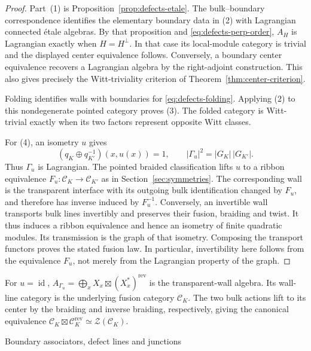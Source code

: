 \documentclass[12pt]{amsart}
\makeatletter
\renewcommand\subsection{\@startsection{subsection}{2}%
  \z@{.5\linespacing\@plus.7\linespacing}{-.5em}%
  {\normalfont\bfseries}}
\numberwithin{equation}{section}
\theoremstyle{definition}
\DeclareMathOperator{\id}{id}
\makeatother
\begin{document}
\begin{proof}
Part~\rm(1) is Proposition~\ref{prop:defects-etale}. The
bulk--boundary correspondence identifies the elementary boundary
data in \rm(2) with Lagrangian connected \'etale algebras.
By that proposition and \eqref{eq:defects-perp-order}, $A_H$ is
Lagrangian exactly when $H=H^\perp$. In that case its local-module
category is trivial and the displayed center equivalence follows.
Conversely, a boundary center equivalence recovers a Lagrangian
algebra by the right-adjoint construction. This also gives precisely
the Witt-triviality criterion of Theorem~\ref{thm:center-criterion}.

Folding identifies walls with boundaries for
\eqref{eq:defects-folding}. Applying \rm(2) to this nondegenerate
pointed category proves \rm(3). The folded category is Witt-trivial
exactly when its two factors represent opposite Witt classes.

For \rm(4), an isometry $u$ gives
$$
(q_K\oplus q_{K'}^{-1})(x,u(x))=1,\qquad
|\Gamma_u|^2=|G_K|\,|G_{K'}|.
$$
Thus $\Gamma_u$ is Lagrangian. The pointed braided classification
lifts $u$ to a ribbon equivalence $F_u:\mathcal C_K\to\mathcal C_{K'}$
as in Section~\ref{sec:symmetries}. The corresponding wall is the
transparent interface with its outgoing bulk identification changed
by $F_u$, and therefore has inverse induced by $F_u^{-1}$.
Conversely, an invertible wall transports bulk lines invertibly and
preserves their fusion, braiding and twist. It thus induces a ribbon
equivalence and hence an isometry of finite quadratic modules.
Its transmission is the graph of that isometry. Composing the
transport functors proves the stated fusion law. In particular,
invertibility here follows from the equivalence $F_u$, not merely
from the Lagrangian property of the graph.
\end{proof}

For $u=\id$, $A_{\Gamma_u}=\bigoplus_x
X_x\boxtimes(X_x^*)^{\mathrm{rev}}$ is the transparent-wall
algebra. Its wall-line category is the underlying fusion category
$\mathcal C_K$. The two bulk actions lift to its center by the
braiding and inverse braiding, respectively, giving the canonical
equivalence
$\mathcal C_K\boxtimes\mathcal C_K^{\mathrm{rev}}
\simeq\mathcal Z(\mathcal C_K)$.


\subsection{Boundary associators, defect lines and junctions}
\end{document}
